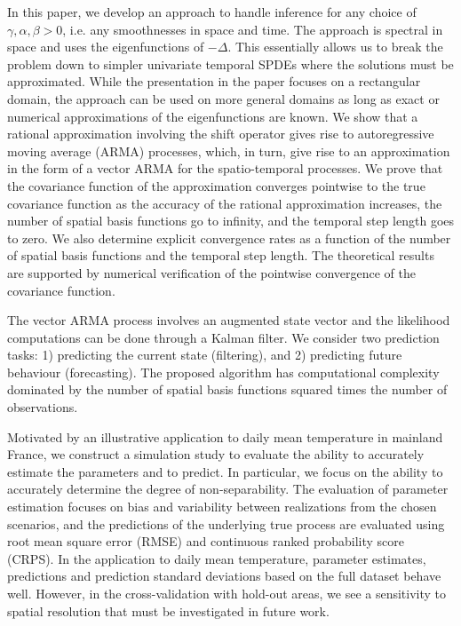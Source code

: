 \documentclass[12pt]{article} %
\begin{document}
In this paper, we develop an approach to handle inference for any choice of $\gamma,\alpha,\beta>0$, i.e. any smoothnesses in space and time. 
The approach is spectral in space and uses the eigenfunctions of $-\Delta$. This essentially allows us to break the problem down to simpler univariate temporal SPDEs where the solutions must be approximated. While the presentation in the paper focuses on a rectangular domain, the approach can be used on more general domains as long as exact or numerical approximations of the eigenfunctions are known. We show that a rational approximation involving the shift operator gives rise to autoregressive moving average (ARMA) processes, which, in turn, give rise to an approximation in the form of a vector ARMA for the spatio-temporal processes. We prove that the covariance function of the approximation converges pointwise to the true covariance function as the accuracy of the rational approximation increases, the number of spatial basis functions go to infinity, and the temporal step length goes to zero. We also determine explicit convergence rates as a function of the number of spatial basis functions and the temporal step length. The theoretical results are supported by numerical verification of the pointwise convergence of the covariance function.

The vector ARMA process involves an augmented state vector and the likelihood computations can be done through a Kalman filter. We consider two prediction tasks: 1) predicting the current state (filtering), and 2) predicting future behaviour (forecasting). The proposed algorithm has computational complexity dominated by the number of spatial basis functions squared times the number of observations. 

Motivated by an illustrative application to daily mean temperature in mainland France, we construct a simulation study to evaluate the ability to accurately estimate the parameters and to predict. In particular, we focus on the ability to accurately determine the degree of non-separability. The evaluation of parameter estimation focuses on bias and variability between realizations from the chosen scenarios, and the predictions of the underlying true process are evaluated using root mean square error (RMSE) and continuous ranked probability score (CRPS). In the application to daily mean temperature, parameter estimates, predictions and prediction standard deviations based on the full dataset behave well. However, in the cross-validation with hold-out areas, we see a sensitivity to spatial resolution that must be investigated in future work.
\end{document}
